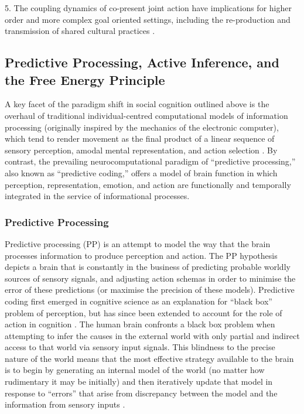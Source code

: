 5. The coupling dynamics of co-present joint action have implications for higher order and more complex goal oriented settings, including the re-production and transmission of shared cultural practices \citep{Dunbar2012,Roepstorff2010,Claidiere2014}.


\begin{mccorrection}
\subsection{Predictive Processing, Active Inference, and the Free Energy Principle}
A key facet of the paradigm shift in social cognition outlined above is the overhaul of traditional individual-centred computational models of information processing (originally inspired by the mechanics of the electronic computer), which tend to render movement as the final product of a linear sequence of sensory perception, amodal mental representation, and action selection \citep{Lewis2005}.  By contrast, the prevailing neurocomputational paradigm of ``predictive processing,'' also known as ``predictive coding,'' \citep[see][]{Frith2007,Kilner2009,Clark2013} offers a model of brain function in which perception, representation, emotion, and action are functionally and temporally integrated in the service of informational processes.

\subsubsection{Predictive Processing}
Predictive processing (PP) is an attempt to model the way that the brain processes information to produce perception and action. The PP hypothesis depicts a brain that is constantly in the business of predicting probable worldly sources of sensory signals, and adjusting action schemas in order to minimise the error of these predictions (or maximise the precision of these models). Predictive coding first emerged in cognitive science as an explanation for ``black box'' problem of perception, but has since been extended to account for the role of action in cognition \citep{Friston2010}.
The human brain confronts a black box problem when attempting to infer the causes in the external world with only partial and indirect access to that world via sensory input signals. This blindness to the precise nature of the world means that the most effective strategy available to the brain is to begin by generating an internal model of the world (no matter how rudimentary it may be initially) and then iteratively update that model in response to ``errors'' that arise from discrepancy between the model and the information from sensory inputs \citep{Frith2007}.


\end{mccorrection}
